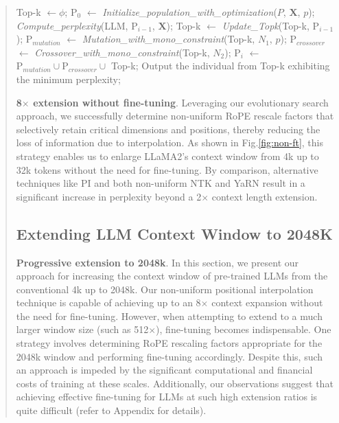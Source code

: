 \begin{abstract}
\begin{algorithm}[t]
	\begin{algorithmic}[1]
		\label{alg:search}
		\STATE Top-k $\gets \phi$;	
		\STATE $\text{P}_0$ $\gets$ \textit{Initialize\_population\_with\_optimization}($P$, $\mathbf{X}$, $p$);
		\STATE \textit{Compute\_perplexity}(LLM, $\text{P}_{i-1}$, $\mathbf{X}$);
		\STATE Top-k $\gets$ \textit{Update\_Topk}(Top-k, $\text{P}_{i-1}$);
		\STATE $\text{P}_{mutation}$ $\gets$ \textit{Mutation\_with\_mono\_constraint}(Top-k, $N_1$, $p$);
		\STATE $\text{P}_{crossover}$ $\gets$ \textit{Crossover\_with\_mono\_constraint}(Top-k, $N_2$);
		\STATE $\text{P}_i$ $\gets$ $\text{P}_{mutation} \cup \text{P}_{crossover} \cup$ Top-k;
		\ENDFOR
		\STATE Output the individual from Top-k exhibiting the minimum perplexity;
	\end{algorithmic}
\end{algorithm}

\textbf{8$\times$ extension without fine-tuning}. Leveraging our evolutionary search approach, we successfully determine non-uniform RoPE rescale factors that selectively retain critical dimensions and positions, thereby reducing the loss of information due to interpolation. As shown in Fig.\ref{fig:non-ft}, this strategy enables us to enlarge LLaMA2's context window from 4k up to 32k tokens without the need for fine-tuning. By comparison, alternative techniques like PI and both non-uniform NTK and YaRN result in a significant increase in perplexity beyond a 2$\times$ context length extension.

\subsection{Extending LLM Context Window to 2048K}
\label{sec:extendto2048k}

\textbf{Progressive extension to 2048k}. In this section, we present our approach for increasing the context window of pre-trained LLMs from the conventional 4k up to 2048k. Our non-uniform positional interpolation technique is capable of achieving up to an 8$\times$ context expansion without the need for fine-tuning. However, when attempting to extend to a much larger window size (such as 512$\times$), fine-tuning becomes indispensable. One strategy involves determining RoPE rescaling factors appropriate for the 2048k window and performing fine-tuning accordingly. Despite this, such an approach is impeded by the significant computational and financial costs of training at these scales. Additionally, our observations suggest that achieving effective fine-tuning for LLMs at such high extension ratios is quite difficult (refer to Appendix for details).


\end{abstract}
